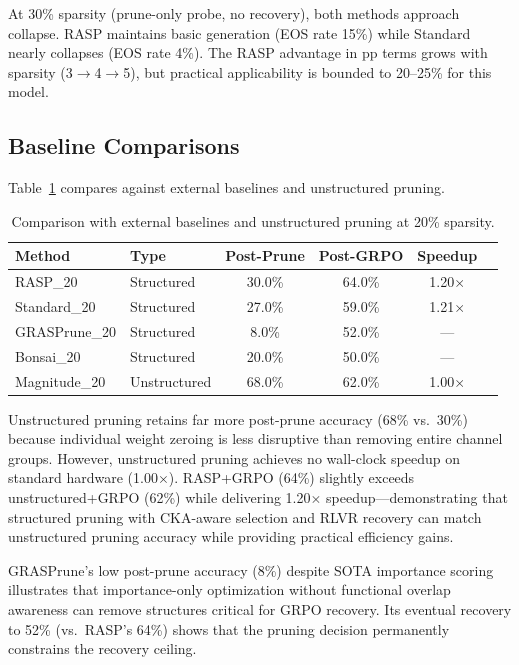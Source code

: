 \documentclass[11pt]{article}
\begin{document}
At 30\% sparsity (prune-only probe, no recovery), both methods approach collapse. RASP maintains basic generation (EOS rate 15\%) while Standard nearly collapses (EOS rate 4\%). The RASP advantage in pp terms grows with sparsity (3$\rightarrow$4$\rightarrow$5), but practical applicability is bounded to 20--25\% for this model.

\subsection{Baseline Comparisons}
\label{sec:baselines}

Table~\ref{tab:baselines} compares against external baselines and unstructured pruning.

\begin{table}[t]
\centering
\caption{Comparison with external baselines and unstructured pruning at 20\% sparsity.}
\label{tab:baselines}
\begin{tabular}{llcccc}
\toprule
\textbf{Method} & \textbf{Type} & \textbf{Post-Prune} & \textbf{Post-GRPO} & \textbf{Speedup} \\
\midrule
RASP\_20 & Structured & 30.0\% & 64.0\% & 1.20$\times$ \\
Standard\_20 & Structured & 27.0\% & 59.0\% & 1.21$\times$ \\
GRASPrune\_20 & Structured & 8.0\% & 52.0\% & --- \\
Bonsai\_20 & Structured & 20.0\% & 50.0\% & --- \\
Magnitude\_20 & Unstructured & 68.0\% & 62.0\% & 1.00$\times$ \\
\bottomrule
\end{tabular}
\end{table}

Unstructured pruning retains far more post-prune accuracy (68\% vs.\ 30\%) because individual weight zeroing is less disruptive than removing entire channel groups. However, unstructured pruning achieves no wall-clock speedup on standard hardware (1.00$\times$). RASP+GRPO (64\%) slightly exceeds unstructured+GRPO (62\%) while delivering 1.20$\times$ speedup---demonstrating that structured pruning with CKA-aware selection and RLVR recovery can match unstructured pruning accuracy while providing practical efficiency gains.

GRASPrune's low post-prune accuracy (8\%) despite SOTA importance scoring illustrates that importance-only optimization without functional overlap awareness can remove structures critical for GRPO recovery. Its eventual recovery to 52\% (vs.\ RASP's 64\%) shows that the pruning decision permanently constrains the recovery ceiling.
\end{document}
